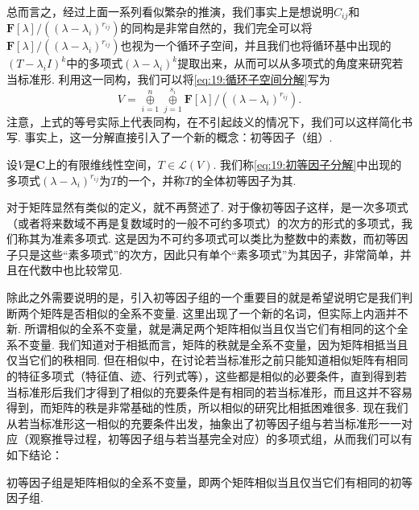 总而言之，经过上面一系列看似繁杂的推演，我们事实上是想说明$C_{ij}$和$\mathbf{F}[\lambda]/((\lambda-\lambda_i)^{r_{ij}})$的同构是非常自然的，我们完全可以将$\mathbf{F}[\lambda]/((\lambda-\lambda_i)^{r_{ij}})$也视为一个循环子空间，并且我们也将循环基中出现的$(T-\lambda_i I)^k$中的多项式$(\lambda-\lambda_i)^k$提取出来，从而可以从多项式的角度来研究若当标准形. 利用这一同构，我们可以将\autoref{eq:19:循环子空间分解}写为
\begin{equation} \label{eq:19:初等因子分解}
    V=\mathop{\oplus}\limits_{i=1}^n\mathop{\oplus}\limits_{j=1}^{s_i} \mathbf{F}[\lambda]/((\lambda-\lambda_i)^{r_{ij}}).
\end{equation}
注意，上式的等号实际上代表同构，在不引起歧义的情况下，我们可以这样简化书写. 事实上，这一分解直接引入了一个新的概念：初等因子（组）.
\begin{definition}
    设$V$是$\mathbf{C}$上的有限维线性空间，$T\in\mathcal{L}(V)$. 我们称\autoref{eq:19:初等因子分解}中出现的多项式$(\lambda-\lambda_i)^{r_{ij}}$为$T$的一个，并称$T$的全体初等因子为其.
\end{definition}

对于矩阵显然有类似的定义，就不再赘述了. 对于像初等因子这样，是一次多项式（或者将来数域不再是复数域时的一般不可约多项式）的次方的形式的多项式，我们称其为准素多项式. 这是因为不可约多项式可以类比为整数中的素数，而初等因子只是这些``素多项式''的次方，因此只有单个``素多项式''为其因子，非常简单，并且在代数中也比较常见.

除此之外需要说明的是，引入初等因子组的一个重要目的就是希望说明它是我们判断两个矩阵是否相似的全系不变量. 这里出现了一个新的名词，但实际上内涵并不新. 所谓相似的全系不变量，就是满足两个矩阵相似当且仅当它们有相同的这个全系不变量. 我们知道对于相抵而言，矩阵的秩就是全系不变量，因为矩阵相抵当且仅当它们的秩相同. 但在相似中，在讨论若当标准形之前只能知道相似矩阵有相同的特征多项式（特征值、迹、行列式等），这些都是相似的必要条件，直到得到若当标准形后我们才得到了相似的充要条件是有相同的若当标准形，而且这并不容易得到，而矩阵的秩是非常基础的性质，所以相似的研究比相抵困难很多. 现在我们从若当标准形这一相似的充要条件出发，抽象出了初等因子组与若当标准形一一对应（观察推导过程，初等因子组与若当基完全对应）的多项式组，从而我们可以有如下结论：

\begin{theorem} \label{thm:19:初等因子组是相似全系不变量}
    初等因子组是矩阵相似的全系不变量，即两个矩阵相似当且仅当它们有相同的初等因子组.
\end{theorem}

